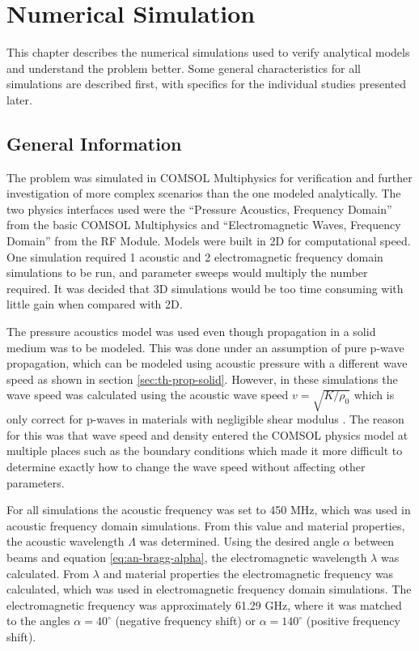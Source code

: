 \documentclass[11pt,twoside]{eitExjobb}
\begin{document}
	
	\chapter{Numerical Simulation} \label{ch:sim}
	This chapter describes the numerical simulations used to verify analytical models and understand the problem better. Some general characteristics for all simulations are described first, with specifics for the individual studies presented later.
	
	\section{General Information}
	The problem was simulated in COMSOL Multiphysics for verification and further investigation of more complex scenarios than the one modeled analytically. The two physics interfaces used were the ``Pressure Acoustics, Frequency Domain'' from the basic COMSOL Multiphysics and ``Electromagnetic Waves, Frequency Domain'' from the RF Module. Models were built in 2D for computational speed. One simulation required 1 acoustic and 2 electromagnetic frequency domain simulations to be run, and parameter sweeps would multiply the number required. It was decided that 3D simulations would be too time consuming with little gain when compared with 2D.
	
	The pressure acoustics model was used even though propagation in a solid medium was to be modeled. This was done under an assumption of pure p-wave propagation, which can be modeled using acoustic pressure with a different wave speed as shown in section \ref{sec:th-prop-solid}. However, in these simulations the wave speed was calculated using the acoustic wave speed $v = \sqrt{K/\rho_0}$ which is only correct for p-waves in materials with negligible shear modulus \cite{Schmerr2016}. The reason for this was that wave speed and density entered the COMSOL physics model at multiple places such as the boundary conditions which made it more difficult to determine exactly how to change the wave speed without affecting other parameters.
	
	For all simulations the acoustic frequency was set to 450 MHz, which was used in acoustic frequency domain simulations. From this value and material properties, the acoustic wavelength $\Lambda$ was determined. Using the desired angle $\alpha$ between beams and equation \eqref{eq:an-bragg-alpha}, the electromagnetic wavelength $\lambda$ was calculated. From $\lambda$ and material properties the electromagnetic frequency was calculated, which was used in electromagnetic frequency domain simulations. The electromagnetic frequency was approximately 61.29 GHz, where it was matched to the angles $\alpha = 40^\circ$ (negative frequency shift) or $\alpha = 140^\circ$ (positive frequency shift).
	
\end{document}
